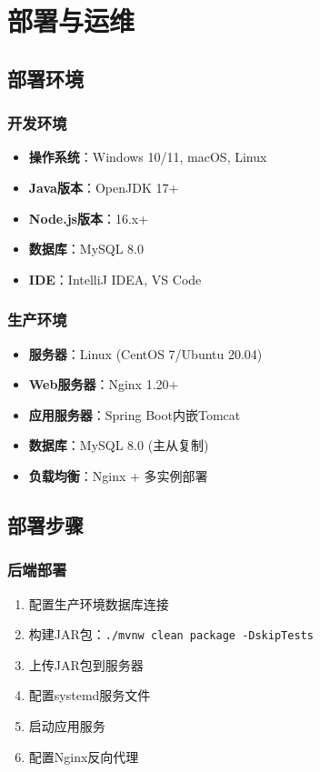 \documentclass[12pt,a4paper]{article}
\begin{document}
\section{部署与运维}

\subsection{部署环境}

\subsubsection{开发环境}
\begin{itemize}
    \item \textbf{操作系统}：Windows 10/11, macOS, Linux
    \item \textbf{Java版本}：OpenJDK 17+
    \item \textbf{Node.js版本}：16.x+
    \item \textbf{数据库}：MySQL 8.0
    \item \textbf{IDE}：IntelliJ IDEA, VS Code
\end{itemize}

\subsubsection{生产环境}
\begin{itemize}
    \item \textbf{服务器}：Linux (CentOS 7/Ubuntu 20.04)
    \item \textbf{Web服务器}：Nginx 1.20+
    \item \textbf{应用服务器}：Spring Boot内嵌Tomcat
    \item \textbf{数据库}：MySQL 8.0 (主从复制)
    \item \textbf{负载均衡}：Nginx + 多实例部署
\end{itemize}

\subsection{部署步骤}

\subsubsection{后端部署}
\begin{enumerate}
    \item 配置生产环境数据库连接
    \item 构建JAR包：\texttt{./mvnw clean package -DskipTests}
    \item 上传JAR包到服务器
    \item 配置systemd服务文件
    \item 启动应用服务
    \item 配置Nginx反向代理
\end{enumerate}
\end{document}

